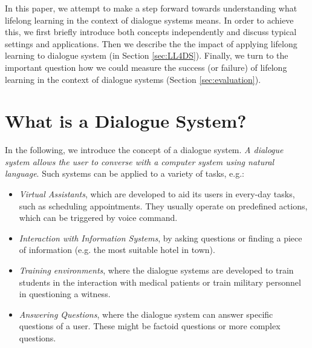 \documentclass{lihlith}
\theoremstyle{definition}
\theoremstyle{remark}
\begin{document}
In this paper, we attempt to make a step forward towards understanding what lifelong learning in the context of dialogue systems means. In order to achieve this, we first briefly introduce both concepts independently and discuss typical settings and applications. Then we describe the the impact of applying lifelong learning to dialogue system (in Section \ref{sec:LL4DS}). Finally, we turn to the important question how we could measure the success (or failure) of lifelong learning in the context of dialogue systems (Section \ref{sec:evaluation}). 


\section{What is a Dialogue System?} 
In the following, we introduce the concept of a dialogue system. \emph{A dialogue system allows the user to converse with a computer system using natural language}. Such systems can be applied to a variety of tasks, e.g.:
\begin{itemize}
\item \emph{Virtual Assistants}, which are developed to aid its users in every-day tasks, such as scheduling appointments. They usually operate on predefined actions, which can be triggered by voice command. 
\item \emph{Interaction with Information Systems}, by asking questions or finding a piece of information (e.g. the most suitable hotel in town).
\item \emph{Training environments}, where the dialogue systems are developed to train students in the interaction with medical patients or train military personnel in questioning a witness.
\item \emph{Answering Questions}, where the dialogue system can answer specific questions of a user. These might be factoid questions or more complex questions. 
\end{itemize}
\end{document}
